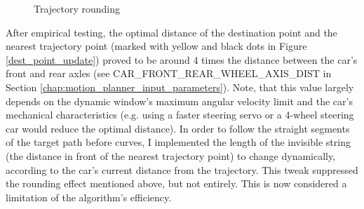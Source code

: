 \begin{figure}[!ht]
    \centering
    \caption{Trajectory rounding}
    \label{traj_rounding}
\end{figure}

After empirical testing, the optimal distance of the destination point and the nearest trajectory point (marked with yellow and black dots in Figure \ref{dest_point_update}) proved to be around 4 times the distance between the car's front and rear axles (see CAR\_FRONT\_REAR\_WHEEL\_AXIS\_DIST in Section \ref{chap:motion_planner_input_parameters}). Note, that this value largely depends on the dynamic window's maximum angular velocity limit and the car's mechanical characteristics (e.g. using a faster steering servo or a 4-wheel steering car would reduce the optimal distance).
In order to follow the straight segments of the target path before curves, I implemented the length of the invisible string (the distance in front of the nearest trajectory point) to change dynamically, according to the car's current distance from the trajectory. This tweak suppressed the rounding effect mentioned above, but not entirely. This is now considered a limitation of the algorithm's efficiency.

